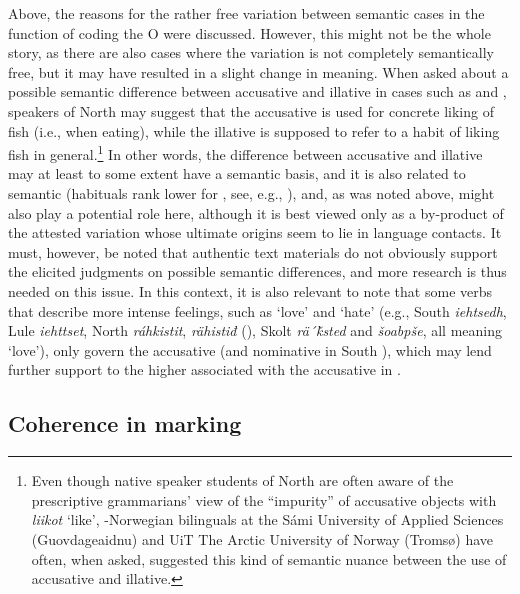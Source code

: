 \documentclass[output=paper]{LSP/langsci}
\begin{document}
\newpage 
 Above, the reasons for the rather free variation between semantic cases in the function of coding the O were discussed. However, this might not be the whole story, as there are also cases where the variation is not completely semantically free, but it may have resulted in a slight change in meaning. When asked about a possible semantic difference between accusative and illative in cases such as  and , speakers of North  may suggest that the accusative is used for concrete liking of fish (i.e., when eating), while the illative is supposed to refer to a habit of liking fish in general.\footnote{Even though native speaker students of North  are often aware of the prescriptive grammarians’ view of the “impurity” of accusative objects with \textit{liikot} `like’, -Norwegian bilinguals at the Sámi University of Applied Sciences (Guovdageaidnu) and UiT The Arctic University of Norway (Tromsø) have often, when asked, suggested this kind of semantic nuance between the use of accusative and illative.
} In other words, the difference between accusative and illative may at least to some extent have a semantic basis, and it is also related to semantic  (habituals rank lower for , see, e.g., \citealt{Gerstner-Link1998transitive}), and, as was noted above,  might also play a potential role here, although it is best viewed only as a by-product of the attested variation whose ultimate origins seem to lie in language contacts. It must, however, be noted that authentic text materials do not obviously support the elicited judgments on possible semantic differences, and more research is thus needed on this issue. In this context, it is also relevant to note that some verbs that describe more intense feelings, such as ‘love’ and ‘hate’ (e.g., South  \textit{iehtsedh}, Lule  \textit{iehttset}, North  \textit{ráhkistit},   \textit{rähistiđ} (\cf {}), Skolt  \textit{rä´ǩsted} and  \textit{šoabpše}, all meaning ‘love’), only govern the accusative (and nominative in South ), which may lend further support to the higher  associated with the accusative in .

\subsection{Coherence in marking}
\label{16-ki-sec:4-4}
\end{document}
